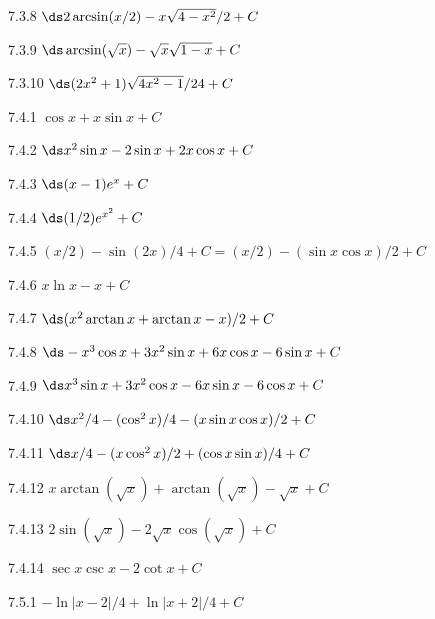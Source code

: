 \begin{Answer}{7.3.8}
 $\ds 2\arcsin(x/2)-x\sqrt{4-x^2}/2+C$
\end{Answer}
\begin{Answer}{7.3.9}
 $\ds \arcsin(\sqrt{x})-\sqrt{x}\sqrt{1-x}+C$
\end{Answer}
\begin{Answer}{7.3.10}
 $\ds (2x^2+1)\sqrt{4x^2-1}/24+C$
\end{Answer}
\begin{Answer}{7.4.1}
 $\cos x+x\sin x+C$
\end{Answer}
\begin{Answer}{7.4.2}
 $\ds x^2\sin x-2 \sin x+2x\cos x +C$
\end{Answer}
\begin{Answer}{7.4.3}
 $\ds (x-1)e^x +C$
\end{Answer}
\begin{Answer}{7.4.4}
 $\ds (1/2)e^{x^2} +C$
\end{Answer}
\begin{Answer}{7.4.5}
 $(x/2)-\sin(2x)/4 +C=$\hfill\break$(x/2)-(\sin x\cos x)/2+C$
\end{Answer}
\begin{Answer}{7.4.6}
 $x\ln x-x +C$
\end{Answer}
\begin{Answer}{7.4.7}
 $\ds (x^2\arctan x +\arctan x -x)/2+C$
\end{Answer}
\begin{Answer}{7.4.8}
 $\ds -x^3\cos x+3x^2\sin x+6x\cos x-6\sin x+C$
\end{Answer}
\begin{Answer}{7.4.9}
 $\ds x^3\sin x+3x^2\cos x-6x\sin x-6\cos x+C$
\end{Answer}
\begin{Answer}{7.4.10}
 $\ds x^2/4-(\cos^2 x)/4-(x\sin x\cos x)/2+C$
\end{Answer}
\begin{Answer}{7.4.11}
 $\ds x/4-(x\cos^2 x)/2+(\cos x\sin x)/4+C$
\end{Answer}
\begin{Answer}{7.4.12}
 $x\arctan(\sqrt x)+\arctan(\sqrt x)-\sqrt{x}+C$
\end{Answer}
\begin{Answer}{7.4.13}
 $2\sin(\sqrt x)-2\sqrt x\cos(\sqrt x)+C$
\end{Answer}
\begin{Answer}{7.4.14}
 $\sec x\csc x-2\cot x+C$
\end{Answer}
\begin{Answer}{7.5.1}
 $-\ln|x-2|/4+\ln|x+2|/4+C$
\end{Answer}
